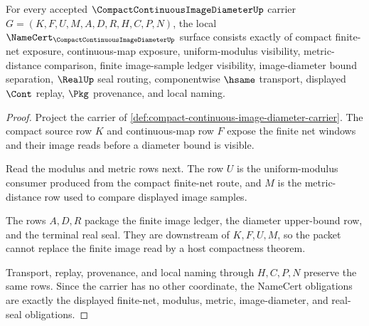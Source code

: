 \begin{theorem}
\label{thm:compact-continuous-image-diameter-namecert-obligations}
For every accepted $\CompactContinuousImageDiameterUp$ carrier $G=(K,F,U,M,A,D,R,H,C,P,N)$, the local $\NameCert_{\CompactContinuousImageDiameterUp}$ surface consists exactly of compact finite-net exposure, continuous-map exposure, uniform-modulus visibility, metric-distance comparison, finite image-sample ledger visibility, image-diameter bound separation, $\RealUp$ seal routing, componentwise $\hsame$ transport, displayed $\Cont$ replay, $\Pkg$ provenance, and local naming.
\end{theorem}
\begin{proof}
Project the carrier of \autoref{def:compact-continuous-image-diameter-carrier}. The compact source row $K$ and continuous-map row $F$ expose the finite net windows and their image reads before a diameter bound is visible.

Read the modulus and metric rows next. The row $U$ is the uniform-modulus consumer produced from the compact finite-net route, and $M$ is the metric-distance row used to compare displayed image samples.

The rows $A,D,R$ package the finite image ledger, the diameter upper-bound row, and the terminal real seal. They are downstream of $K,F,U,M$, so the packet cannot replace the finite image read by a host compactness theorem.

Transport, replay, provenance, and local naming through $H,C,P,N$ preserve the same rows. Since the carrier has no other coordinate, the NameCert obligations are exactly the displayed finite-net, modulus, metric, image-diameter, and real-seal obligations.
\end{proof}


